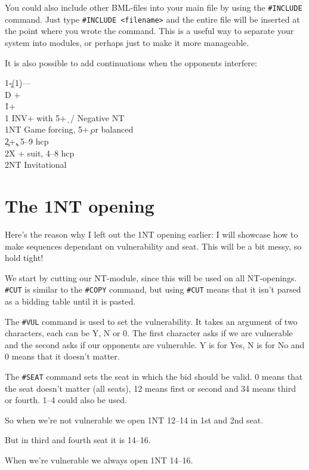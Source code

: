\documentclass[a4paper]{article}
\begin{document}
You could also include other BML-files into your main file by using
the \texttt{\#INCLUDE} command. Just type \texttt{\#INCLUDE <filename>} and the entire
file will be inserted at the point where you wrote the command. This
is a useful way to separate your system into modules, or perhaps
just to make it more manageable.

It is also possible to add continuations when the opponents
interfere:

\begin{bidtable}
1\c-(1\d)---\\
D +\h\\
1\h {}+\s\\
1\s \> INV+ with 5+\d\ / Negative NT\\
1NT \> Game forcing, 5+\c\ or balanced\\
2\c {}+\c, 5--9 hcp\\
2X + suit, 4--8 hcp\\
2NT \> Invitational
\end{bidtable}

\section{The 1NT opening}

Here's the reason why I left out the 1NT opening earlier: I will
showcase how to make sequences dependant on vulnerability and
seat. This will be a bit messy, so hold tight!

We start by cutting our NT-module, since this will be used on all
NT-openings. \texttt{\#CUT} is similar to the \texttt{\#COPY} command, but using \texttt{\#CUT}
means that it isn't parsed as a bidding table until it is pasted.

The \texttt{\#VUL} command is used to set the vulnerability. It takes an
argument of two characters, each can be Y, N or 0. The first
character asks if we are vulnerable and the second asks if our
opponents are vulnerable. Y is for Yes, N is for No and 0 means that
it doesn't matter.

The \texttt{\#SEAT} command sets the seat in which the bid should be valid. 0
means that the seat doesn't matter (all seats), 12 means first or
second and 34 means third or fourth. 1--4 could also be used.

So when we're not vulnerable we open 1NT 12--14 in 1st and 2nd seat.

But in third and fourth seat it is 14--16.

When we're vulnerable we always open 1NT 14--16.
\end{document}
